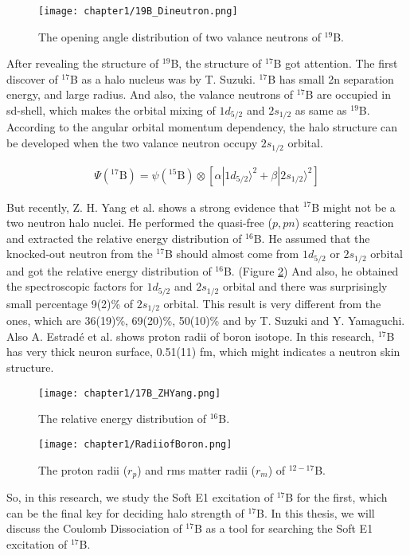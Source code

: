 \begin{figure}[t]
    \centering
    \texttt{[image: chapter1/19B\_Dineutron.png]}
    \caption{The opening angle distribution of two valance neutrons of $^{19}$B.}
    \label{dineutron}
\end{figure}


After revealing the structure of $^{19}$B, the structure of $^{17}$B got attention. The first discover of $^{17}$B as a halo nucleus was by T. Suzuki.\cite{Suzuki99} $^{17}$B has small 2n separation energy, and large radius. And also, the valance neutrons of $^{17}$B are occupied in sd-shell, which makes the orbital mixing of $1d_{5/2}$ and $2s_{1/2}$ as same as $^{19}$B. According to the angular orbital momentum dependency, the halo structure can be developed when the two valance neutron occupy $2s_{1/2}$ orbital. 

\begin{align}
    \Psi(^{17}\text{B}) = \psi(^{15}\text{B}) \otimes [\alpha |1d_{5/2} \rangle^2 + \beta |2s_{1/2} \rangle^2]
\end{align}

But recently, Z. H. Yang et al. \cite{ZHYang} shows a strong evidence that $^{17}$B might not be a two neutron halo nuclei. He performed the quasi-free ($p,pn$) scattering reaction and extracted the relative energy distribution of $^{16}$B. He assumed that the knocked-out neutron from the $^{17}$B  should almost come from $1d_{5/2}$ or $2s_{1/2}$ orbital and got the relative energy distribution of $^{16}$B. (Figure \ref{fig:quasi-free}) And also, he obtained the spectroscopic factors for $1d_{5/2}$ and $2s_{1/2}$ orbital and there was surprisingly small percentage 9(2)\% of $2s_{1/2}$ orbital. This result is very different from the ones, which are 36(19)\%, 69(20)\%, 50(10)\% and by T. Suzuki and Y. Yamaguchi. \cite{Suzuki99} \cite{Suzuki02} \cite{Yamaguchi} Also A. Estradé et al. \cite{Estrade} shows proton radii of boron isotope. In this research, $^{17}$B has very thick neuron surface, 0.51(11) fm, which might indicates a neutron skin structure. 

\begin{figure}
    \centering
    \texttt{[image: chapter1/17B\_ZHYang.png]}
    \caption{The relative energy distribution of $^{16}$B.\cite{ZHYang}}
    \label{fig:quasi-free}
\end{figure}

\begin{figure}
    \centering
    \texttt{[image: chapter1/RadiiofBoron.png]}
    \caption{The proton radii ($r_p$) and rms matter radii ($r_m$) of $^{12-17}$B. \cite{Estrade}}
\end{figure}
So, in this research, we study the Soft E1 excitation of $^{17}$B for the first, which can be the final key for deciding halo strength of $^{17}$B. In this thesis, we will discuss the Coulomb Dissociation of $^{17}$B as a tool for searching the Soft E1 excitation of $^{17}$B. 


